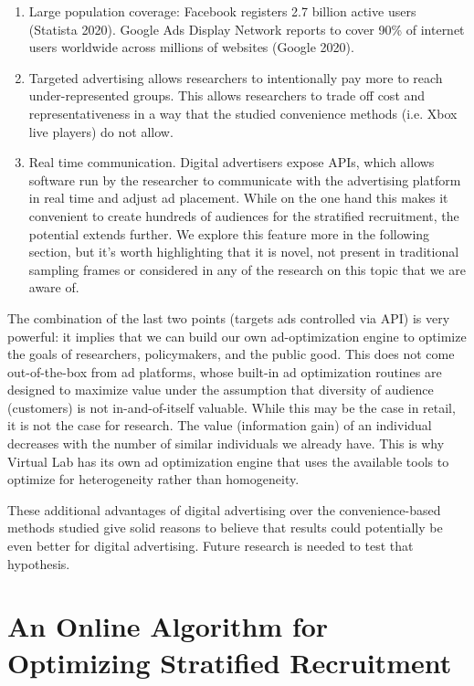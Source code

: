 \documentclass[a4paper,12pt]{article}
\theoremstyle{proposition}
\begin{document}
\begin{enumerate}
\item Large population coverage: Facebook registers 2.7 billion active users (Statista 2020). Google Ads Display Network reports to cover 90\% of internet users worldwide across millions of websites (Google 2020).

\item Targeted advertising allows researchers to intentionally pay more to reach under-represented groups. This allows researchers to trade off cost and representativeness in a way that the studied convenience methods (i.e. Xbox live players) do not allow.

\item Real time communication. Digital advertisers expose APIs, which allows software run by the researcher to communicate with the advertising platform in real time and adjust ad placement. While on the one hand this makes it convenient to create hundreds of audiences for the stratified recruitment, the potential extends further. We explore this feature more in the following section, but it’s worth highlighting that it is novel, not present in traditional sampling frames or considered in any of the research on this topic that we are aware of.
\end{enumerate}


The combination of the last two points (targets ads controlled via API) is very powerful: it implies that we can build our own ad-optimization engine to optimize the goals of researchers, policymakers, and the public good. This does not come out-of-the-box from ad platforms, whose built-in ad optimization routines are designed to maximize value under the assumption that diversity of audience (customers) is not in-and-of-itself valuable. While this may be the case in retail, it is not the case for research. The value (information gain) of an individual decreases with the number of similar individuals we already have. This is why Virtual Lab has its own ad optimization engine that uses the available tools to optimize for heterogeneity rather than homogeneity.

These additional advantages of digital advertising over the convenience-based methods studied give solid reasons to believe that results could potentially be even better for digital advertising. Future research is needed to test that hypothesis.


\section{An Online Algorithm for Optimizing Stratified Recruitment}
\end{document}
